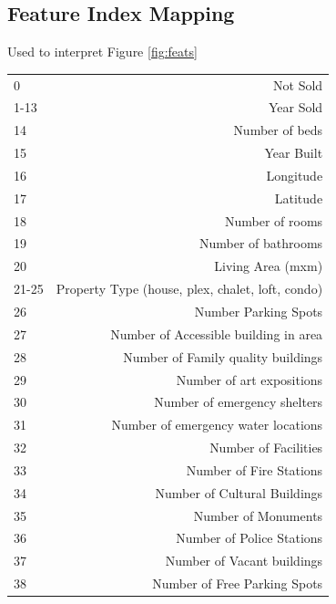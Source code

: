 \documentclass{acm_proc_article-sp}
\begin{document}
\subsection{Feature Index Mapping}
Used to interpret Figure \ref{fig:feats} \\

\begin{tabular}{ l | r }
  0 & Not Sold \\
  1-13 & Year Sold \\
  14 & Number of beds \\
  15 & Year Built\\
  16 & Longitude\\
  17 & Latitude\\
  18 & Number of rooms\\
  19 & Number of bathrooms\\
  20 & Living Area (mxm)\\
  21-25 & Property Type (house, plex, chalet, loft, condo)\\
  26 & Number Parking Spots\\
  27 & Number of Accessible building in area\\
  28 & Number of Family quality buildings\\
  29 & Number of art expositions\\
  30 & Number of emergency shelters\\
  31 & Number of emergency water locations\\
  32 & Number of Facilities\\
  33 & Number of Fire Stations\\
  34 & Number of Cultural Buildings\\
  35 & Number of Monuments\\
  36 & Number of Police Stations\\
  37 & Number of Vacant buildings \\
  38 & Number of Free Parking Spots\\
\end{tabular}
\end{document}
